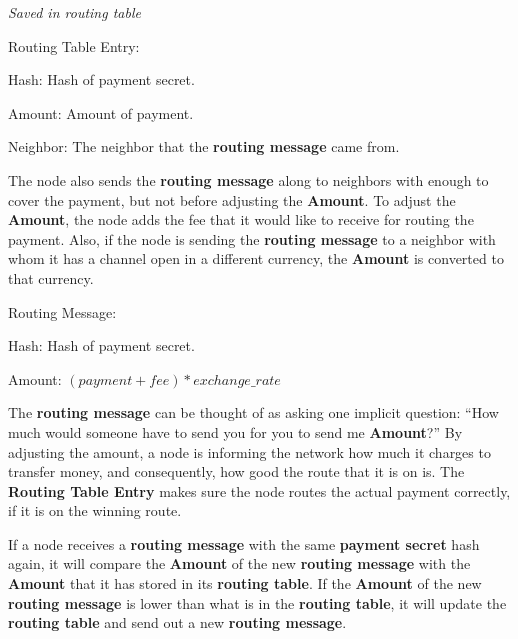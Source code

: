 \documentclass[a4paper]{article}
\newcommand{\bgls}[1]{\textbf{\gls{#1}}}
\newenvironment{mydescription}
{\begin{description}
\setlength{\itemsep}{5pt}
  \setlength{\parskip}{0pt}
  \setlength{\labelsep}{5pt}
}{
\end{description}}
\begin{document}
\begin{mdframed}[style=message]{\emph{Saved in routing table}}
\begin{mydescription}
\item[Routing Table Entry:] \hfill
\begin{mydescription}
  \item[Hash:] Hash of payment secret.
  \item[Amount:] Amount of payment.
  \item[Neighbor:] The neighbor that the \bgls{routing message} came from.
\end{mydescription}
\end{mydescription}
\end{mdframed}

The node also sends the \bgls{routing message} along to neighbors with enough to cover the payment, but not before adjusting the \textbf{Amount}. To adjust the \textbf{Amount}, the node adds the fee that it would like to receive for routing the payment. Also, if the node is sending the \bgls{routing message} to a neighbor with whom it has a channel open in a different currency, the \textbf{Amount} is converted to that currency.

\begin{mdframed}[style=message]
\begin{mydescription}
\item[Routing Message:] \hfill
\begin{mydescription}
  \item[Hash:] Hash of payment secret.
  \item[Amount:]   $(payment + fee) * exchange\_rate$
\end{mydescription}
\end{mydescription}
\end{mdframed}

The \bgls{routing message} can be thought of as asking one implicit question: ``How much would someone have to send you for you to send me \textbf{Amount}?'' By adjusting the amount, a node is informing the network how much it charges to transfer money, and consequently, how good the route that it is on is. The \textbf{Routing Table Entry} makes sure the node routes the actual payment correctly, if it is on the winning route.

If a node receives a \bgls{routing message} with the same \bgls{payment secret} hash again, it will compare the \textbf{Amount} of the new \bgls{routing message} with the \textbf{Amount} that it has stored in its \bgls{routing table}. If the \textbf{Amount} of the new \bgls{routing message} is lower than what is in the \bgls{routing table}, it will update the \bgls{routing table} and send out a new \bgls{routing message}.
\end{document}
